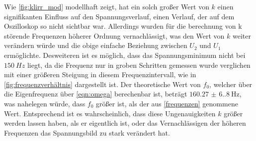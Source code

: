     Wie \ref{fig:klirr_mod} modellhaft zeigt, hat ein solch großer Wert von $k$ einen signifikanten Einfluss auf den Spannungsverlauf, einen
    Verlauf, der auf dem Oszilloskop so nicht sichtbar war.
    Allerdings wurden für die berechnung von k störende Frequenzen höherer Ordnung vernachlässigt, was den Wert von $k$ weiter
    verändern würde und die obige einfache Beziehung zwischen $U_2$ und $U_1$ ermöglichte. Desweiteren ist es möglich, dass 
    das Spannungsminimum nicht bei $\qty{150}{Hz}$ liegt, da die Frequenz nur in groben Schritten gemessen wurde verglichen mit einer
    größeren Steigung in diesem Frequenzintervall, wie in \ref{fig:frequenzverhältnis} dargestellt ist. Der theoretische Wert von
    $f_0$, welcher über die Eigenfrequenz über \ref{eqn:omega} berechenbar ist, beträgt $\qty{160.27(6.80)}{\hertz}$, was nahelegen würde,
    dass $f_0$ größer ist, als der aus \ref{frequenzen} genommene Wert. Entsprechend ist es wahrscheinlich, dass diese Ungenauigkeiten $k$ größer
    werden lassen haben, als er eigentlich ist, oder das Vernachlässigen der höheren Frequenzen das Spannungsbild zu stark verändert hat.

    \label{sec:Diskussion}
